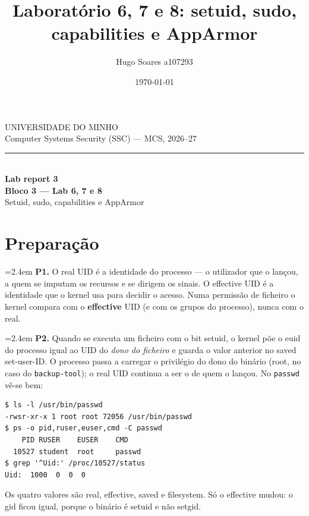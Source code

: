 \documentclass[a4paper,11pt]{article}
\title{Laborat\'orio 6, 7 e 8: setuid, sudo, capabilities e AppArmor}
\author{Hugo Soares a107293}
\date{\today}
\newenvironment{answer}[1]{%
  \par\addvspace{7pt}\noindent
  \hangindent=2.4em\hangafter=1
  {\color{sscnblue}\bfseries #1\hspace{0.55em}}\ignorespaces}
  {\par\addvspace{5pt}}
\newcommand{\cmd}[1]{\textcolor{sscnblue}{\texttt{#1}}}
\begin{document}
\begin{titlepage}
\thispagestyle{empty}
\begin{center}
    \vspace*{1.5cm}
    {\large\color{sscmute}\MakeUppercase{Universidade do Minho}}\\[2pt]
    {\small\color{sscmute}Computer Systems Security (SSC) --- MCS, 2026--27}\\[8pt]
    {\color{sscline}\rule{0.8\textwidth}{0.8pt}}\\[2.2cm]

    {\LARGE\bfseries\color{sscnblue}Lab report 3\\[6pt]
     Bloco 3 --- Lab 6, 7 e 8}\\[0.7cm]
    {\large\color{sscblue}Setuid, sudo, capabilities e AppArmor}\\[3.0cm]

    \vfill
\end{center}
\end{titlepage}

\section{Prepara\c{c}\~ao}

\begin{answer}{P1.}
O real UID \'e a identidade do processo --- o utilizador que o lan\c{c}ou, a quem se
imputam os recursos e se dirigem os sinais. O effective UID \'e a identidade que o kernel
usa para decidir o acesso. Numa permiss\~ao de ficheiro o kernel compara com o
\textbf{effective} UID (e com os grupos do processo), nunca com o real.
\end{answer}

\begin{answer}{P2.}
Quando se executa um ficheiro com o bit setuid, o kernel p\~oe o euid do processo igual ao
UID do \emph{dono do ficheiro} e guarda o valor anterior no saved set-user-ID. O processo
passa a carregar o privil\'egio do dono do bin\'ario (root, no caso do
\cmd{backup-tool}); o real UID continua a ser o de quem o lan\c{c}ou. No \cmd{passwd}
v\^e-se bem:

\begin{lstlisting}
$ ls -l /usr/bin/passwd
-rwsr-xr-x 1 root root 72056 /usr/bin/passwd
$ ps -o pid,ruser,euser,cmd -C passwd
    PID RUSER    EUSER    CMD
  10527 student  root     passwd
$ grep '^Uid:' /proc/10527/status
Uid:  1000  0  0  0
\end{lstlisting}

Os quatro valores s\~ao real, effective, saved e filesystem. S\'o o effective mudou: o
gid ficou igual, porque o bin\'ario \'e setuid e n\~ao setgid.
\end{answer}
\end{document}
